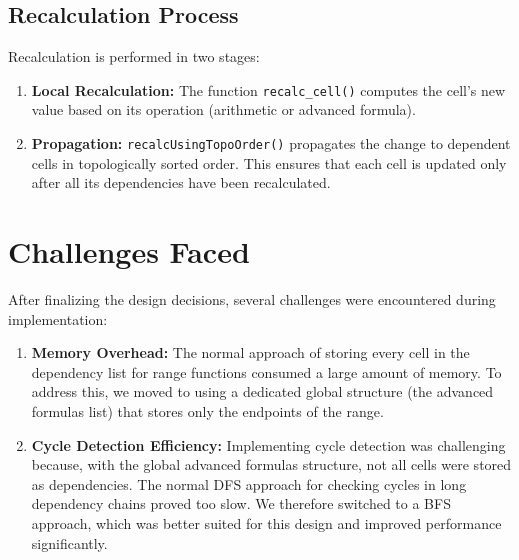 \documentclass[12pt]{article}
\begin{document}
\subsection{Recalculation Process}
Recalculation is performed in two stages:
\begin{enumerate}[noitemsep]
    \item \textbf{Local Recalculation:} The function \texttt{recalc\_cell()} computes the cell's new value based on its operation (arithmetic or advanced formula).
    \item \textbf{Propagation:} \texttt{recalcUsingTopoOrder()} propagates the change to dependent cells in topologically sorted order. This ensures that each cell is updated only after all its dependencies have been recalculated.
\end{enumerate}

\section{Challenges Faced}
After finalizing the design decisions, several challenges were encountered during implementation:
\begin{enumerate}[noitemsep]
    \item \textbf{Memory Overhead:} The normal approach of storing every cell in the dependency list for range functions consumed a large amount of memory. To address this, we moved to using a dedicated global structure (the advanced formulas list) that stores only the endpoints of the range.
    \item \textbf{Cycle Detection Efficiency:} Implementing cycle detection was challenging because, with the global advanced formulas structure, not all cells were stored as dependencies. The normal DFS approach for checking cycles in long dependency chains proved too slow. We therefore switched to a BFS approach, which was better suited for this design and improved performance significantly.
\end{enumerate}
\end{document}

